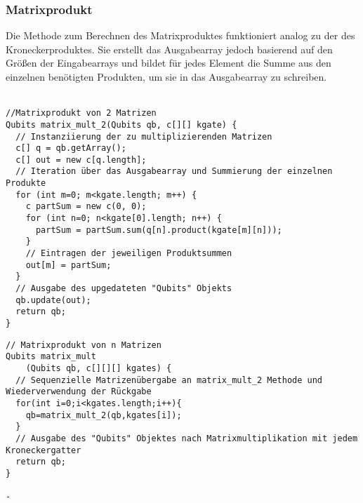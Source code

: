 \documentclass[12pt]{report}
\begin{document}
\subsubsection{Matrixprodukt}
Die Methode zum Berechnen des Matrixproduktes funktioniert analog zu der des Kroneckerproduktes.
Sie erstellt das Ausgabearray jedoch basierend auf den Größen der Eingabearrays und bildet für jedes Element die Summe aus den einzelnen benötigten Produkten, um sie in das Ausgabearray zu schreiben.\\
\vspace{-0.7cm}\\
\lstset{escapechar=@,style=customcsmall}
\noindent\begin{minipage}[t]{.60\textwidth} 
\hspace*{0pt}
\begin{lstlisting}
//Matrixprodukt von 2 Matrizen
Qubits matrix_mult_2(Qubits qb, c[][] kgate) {
  // Instanziierung der zu multiplizierenden Matrizen
  c[] q = qb.getArray();
  c[] out = new c[q.length];
  // Iteration über das Ausgabearray und Summierung der einzelnen Produkte
  for (int m=0; m<kgate.length; m++) {
    c partSum = new c(0, 0);
    for (int n=0; n<kgate[0].length; n++) {
      partSum = partSum.sum(q[n].product(kgate[m][n]));
    }
    // Eintragen der jeweiligen Produktsummen
    out[m] = partSum;
  }
  // Ausgabe des upgedateten "Qubits" Objekts
  qb.update(out);
  return qb;
}
\end{lstlisting} 
\end{minipage}
\hfill \hspace{0.2cm}
\begin{minipage}[t]{.39\textwidth} 
\hspace*{0pt}
\begin{lstlisting}
// Matrixprodukt von n Matrizen
Qubits matrix_mult
    (Qubits qb, c[][][] kgates) {
  // Sequenzielle Matrizenübergabe an matrix_mult_2 Methode und Wiederverwendung der Rückgabe
  for(int i=0;i<kgates.length;i++){
    qb=matrix_mult_2(qb,kgates[i]);
  }
  // Ausgabe des "Qubits" Objektes nach Matrixmultiplikation mit jedem Kroneckergatter
  return qb;
}
																								-
\end{lstlisting} 
\end{minipage}

\newpage
\end{document}
